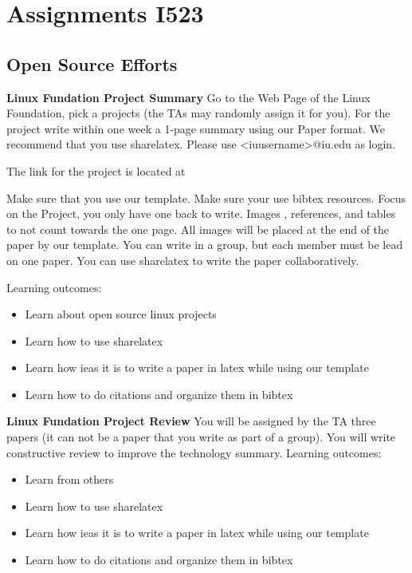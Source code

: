 \section{Assignments I523}
\label{s:i523-assignment}

\subsection{Open Source Efforts}

\begin{exercise} {\bf Linux Fundation Project Summary} 
Go to the Web Page of the Linux Foundation, pick a projects (the TAs
may randomly assign it for you). For the project write within
one week a 1-page summary using our Paper format. We recommend that
you use sharelatex. Please use <iuusername>@iu.edu as login. 

The link for the project is located at

Make sure that you use our template. Make sure your use bibtex
resources. Focus on the Project, you only have one back to
write. Images , references, and tables to not count towards the one
page. All images will be placed at the end of the paper by our
template. You can write in a group, but each member must be lead on
one paper. You can use sharelatex to write the paper collaboratively.

Learning outcomes:
\begin{itemize}
\item Learn about open source linux projects
\item Learn how to use sharelatex
\item Learn how ieas it is to write a paper in latex while using our
  template
\item Learn how to do citations and organize them in bibtex
\end{itemize}
\end{exercise} 

\begin{exercise} {\bf Linux Fundation Project Review}
You will be assigned by the TA three papers (it can not be a paper that you
write as part of a group). You will write constructive  review to
improve the technology summary.
Learning outcomes:
\begin{itemize}
\item Learn from others 
\item Learn how to use sharelatex
\item Learn how ieas it is to write a paper in latex while using our
  template
\item Learn how to do citations and organize them in bibtex
\end{itemize}

\end{exercise} 

